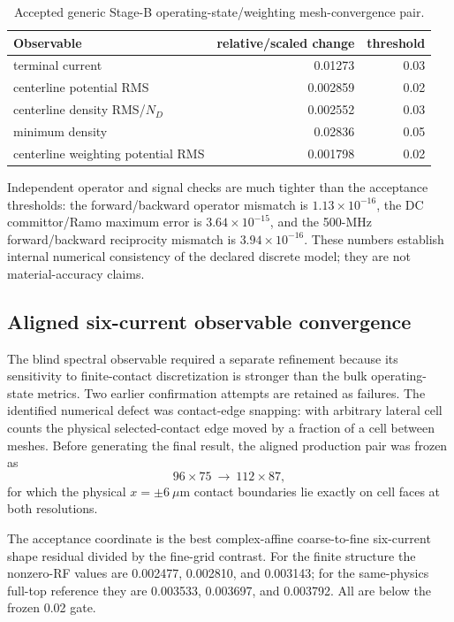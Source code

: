 \documentclass[11pt]{article}
\begin{document}
\begin{table}[H]
\centering
\caption{Accepted generic Stage-B operating-state/weighting mesh-convergence pair.}
\label{tab:stagebmesh}
\begin{tabular}{lrr}
\toprule
Observable & relative/scaled change & threshold\\
\midrule
terminal current & 0.01273 & 0.03\\
centerline potential RMS & 0.002859 & 0.02\\
centerline density RMS/$N_D$ & 0.002552 & 0.03\\
minimum density & 0.02836 & 0.05\\
centerline weighting potential RMS & 0.001798 & 0.02\\
\bottomrule
\end{tabular}
\end{table}

Independent operator and signal checks are much tighter than the acceptance thresholds: the forward/backward operator mismatch is $1.13\times10^{-16}$, the DC committor/Ramo maximum error is $3.64\times10^{-15}$, and the 500-MHz forward/backward reciprocity mismatch is $3.94\times10^{-16}$. These numbers establish internal numerical consistency of the declared discrete model; they are not material-accuracy claims.

\subsection{Aligned six-current observable convergence}

The blind spectral observable required a separate refinement because its sensitivity to finite-contact discretization is stronger than the bulk operating-state metrics. Two earlier confirmation attempts are retained as failures. The identified numerical defect was contact-edge snapping: with arbitrary lateral cell counts the physical selected-contact edge moved by a fraction of a cell between meshes. Before generating the final result, the aligned production pair was frozen as
\begin{equation}
96\times75\ \longrightarrow\ 112\times87,
\end{equation}
for which the physical $x=\pm6~\mu\mathrm m$ contact boundaries lie exactly on cell faces at both resolutions.

The acceptance coordinate is the best complex-affine coarse-to-fine six-current shape residual divided by the fine-grid contrast. For the finite structure the nonzero-RF values are 0.002477, 0.002810, and 0.003143; for the same-physics full-top reference they are 0.003533, 0.003697, and 0.003792. All are below the frozen 0.02 gate.
\end{document}
